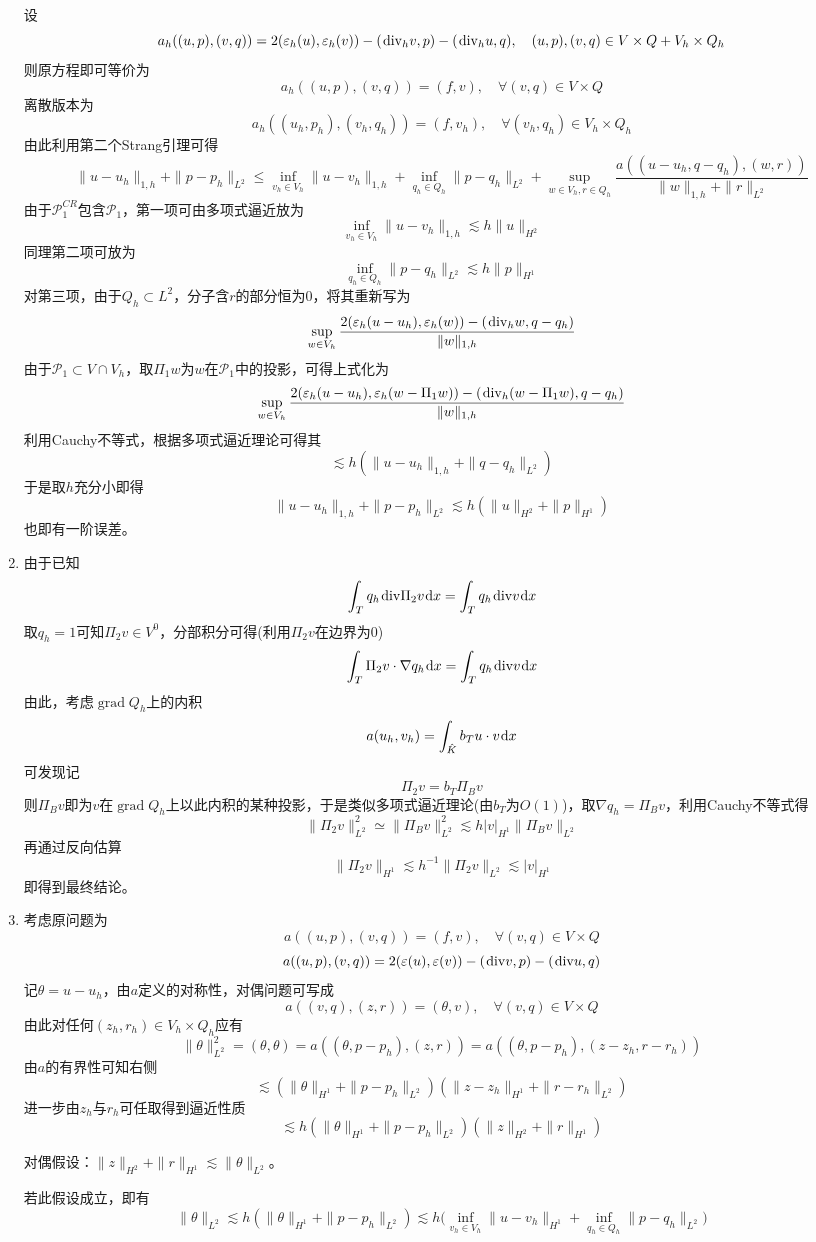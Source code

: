 \documentclass[a4paper,UTF8,fontset=windows,10pt]{ctexart}
\renewcommand{\div}{\hspace{0.09em}\mathrm{div}}
\newcommand*{\dr}{\hspace{0.07em}\mathrm{d}}
\DeclareMathOperator*{\grad}{grad}
\begin{document}
\begin{enumerate}
    设
    $$a_h((u,p),(v,q))=2(\varepsilon_h(u),\varepsilon_h(v))-(\div_hv,p)-(\div_hu,q),\quad(u,p),(v,q)\in V\times Q+V_h\times Q_h$$
    则原方程即可等价为
    $$a_h((u,p),(v,q))=(f,v),\quad\forall(v,q)\in V\times Q$$
    离散版本为
    $$a_h((u_h,p_h),(v_h,q_h))=(f,v_h),\quad\forall(v_h,q_h)\in V_h\times Q_h$$
    由此利用第二个Strang引理可得
    $$\|u-u_h\|_{1,h}+\|p-p_h\|_{L^2}\le\inf_{v_h\in V_h}\|u-v_h\|_{1,h}+\inf_{q_h\in Q_h}\|p-q_h\|_{L^2}+\sup_{w\in V_h,r\in Q_h}\frac{a((u-u_h,q-q_h),(w,r))}{\|w\|_{1,h}+\|r\|_{L^2}}$$
    由于$\mathcal{P}_1^{CR}$包含$\mathcal{P}_1$，第一项可由多项式逼近放为
    $$\inf_{v_h\in V_h}\|u-v_h\|_{1,h}\lesssim h\|u\|_{H^2}$$
    同理第二项可放为
    $$\inf_{q_h\in Q_h}\|p-q_h\|_{L^2}\lesssim h\|p\|_{H^1}$$
    对第三项，由于$Q_h\subset L^2$，分子含$r$的部分恒为0，将其重新写为
    $$\sup_{w\in V_h}\frac{2(\varepsilon_h(u-u_h),\varepsilon_h(w))-(\div_h w,q-q_h)}{\|w\|_{1,h}}$$
    由于$\mathcal{P}_1\subset V\cap V_h$，取$\Pi_1w$为$w$在$\mathcal{P}_1$中的投影，可得上式化为
    $$\sup_{w\in V_h}\frac{2(\varepsilon_h(u-u_h),\varepsilon_h(w-\Pi_1w))-(\div_h(w-\Pi_1w),q-q_h)}{\|w\|_{1,h}}$$
    利用Cauchy不等式，根据多项式逼近理论可得其
    $$\lesssim h(\|u-u_h\|_{1,h}+\|q-q_h\|_{L^2})$$
    于是取$h$充分小即得
    $$\|u-u_h\|_{1,h}+\|p-p_h\|_{L^2}\lesssim h(\|u\|_{H^2}+\|p\|_{H^1})$$
    也即有一阶误差。

    \item
    由于已知
    $$\int_Tq_h\div\Pi_2v\dr x=\int_Tq_h\div v\dr x$$
    取$q_h=1$可知$\Pi_2v\in V^0$，分部积分可得(利用$\Pi_2v$在边界为0)
    $$\int_T\Pi_2v\cdot\nabla q_h\dr x=\int_Tq_h\div v\dr x$$
    由此，考虑$\grad Q_h$上的内积
    $$a(u_h,v_h)=\int_{\hat{K}}b_Tu\cdot v\dr x$$
    可发现记
    $$\Pi_2v=b_T\Pi_Bv$$
    则$\Pi_Bv$即为$v$在$\grad Q_h$上以此内积的某种投影，于是类似多项式逼近理论(由$b_T$为$O(1)$)，取$\nabla q_h=\Pi_Bv$，利用Cauchy不等式得
    $$\|\Pi_2v\|_{L^2}^2\simeq\|\Pi_Bv\|_{L^2}^2\lesssim h|v|_{H^1}\|\Pi_Bv\|_{L^2}$$
    再通过反向估算
    $$\|\Pi_2v\|_{H^1}\lesssim h^{-1}\|\Pi_2v\|_{L^2}\lesssim|v|_{H^1}$$
    即得到最终结论。

    \item
    考虑原问题为
    $$a((u,p),(v,q))=(f,v),\quad\forall(v,q)\in V\times Q$$
    $$a((u,p),(v,q))=2(\varepsilon(u),\varepsilon(v))-(\div v,p)-(\div u,q)$$
    记$\theta=u-u_h$，由$a$定义的对称性，对偶问题可写成
    $$a((v,q),(z,r))=(\theta,v),\quad\forall(v,q)\in V\times Q$$
    由此对任何$(z_h,r_h)\in V_h\times Q_h$应有
    $$\|\theta\|_{L^2}^2=(\theta,\theta)=a((\theta,p-p_h),(z,r))=a((\theta,p-p_h),(z-z_h,r-r_h))$$
    由$a$的有界性可知右侧
    $$\lesssim(\|\theta\|_{H^1}+\|p-p_h\|_{L^2})(\|z-z_h\|_{H^1}+\|r-r_h\|_{L^2})$$
    进一步由$z_h$与$r_h$可任取得到逼近性质
    $$\lesssim h(\|\theta\|_{H^1}+\|p-p_h\|_{L^2})(\|z\|_{H^2}+\|r\|_{H^1})$$

    对偶假设：$\|z\|_{H^2}+\|r\|_{H^1}\lesssim\|\theta\|_{L^2}$。

    若此假设成立，即有
    $$\|\theta\|_{L^2}\lesssim h(\|\theta\|_{H^1}+\|p-p_h\|_{L^2})\lesssim h\bigg(\inf_{v_h\in V_h}\|u-v_h\|_{H^1}+\inf_{q_h\in Q_h}\|p-q_h\|_{L^2}\bigg)$$
\end{enumerate}
\end{document}

